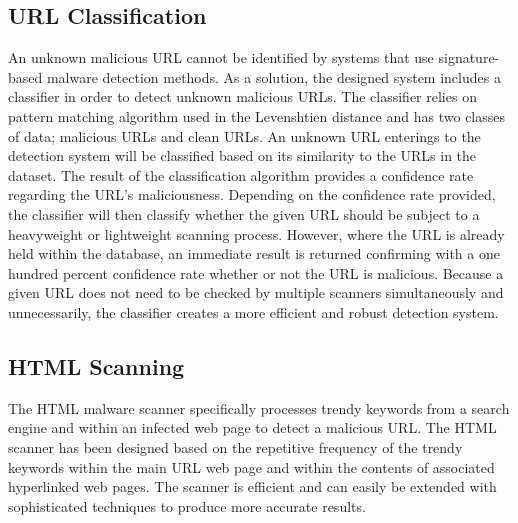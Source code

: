 \subsection{URL Classification}

An unknown malicious URL cannot be identified by systems that use signature-based malware detection methods. As a solution, the designed system includes a classifier in order to detect unknown malicious URLs. The classifier relies on pattern matching algorithm used in the Levenshtien distance and has two classes of data; malicious URLs and clean URLs. An unknown URL enterings to the detection system will be classified based on its similarity to the URLs in the dataset. The result of the classification algorithm provides a confidence rate regarding the URL’s maliciousness. Depending on the confidence rate provided, the classifier will then classify whether the given URL should be subject to a heavyweight or lightweight scanning process. However, where the URL is already held within the database, an immediate result is returned confirming with a one hundred percent confidence rate whether or not the URL is malicious. Because a given URL does not need to be checked by multiple scanners simultaneously and unnecessarily, the classifier creates a more efficient and robust detection system. 
 
\subsection{HTML Scanning}

The HTML malware scanner specifically processes trendy keywords from a search engine and within an infected web page to detect a malicious URL. The HTML scanner has been designed based on the repetitive frequency of the trendy keywords within the main URL web page and within the contents of associated hyperlinked web pages. The scanner is efficient and can easily be extended with sophisticated techniques to produce more accurate results. 
